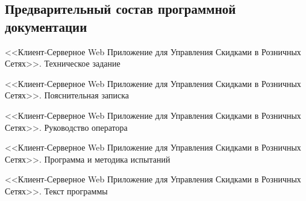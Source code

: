 \subsection{Предварительный состав программной документации}
\begin{my_enumerate}
    \item <<Клиент-Серверное Web Приложение для Управления Скидками в Розничных
      Сетях>>. Техническое задание
    \item <<Клиент-Серверное Web Приложение для Управления Скидками в Розничных
      Сетях>>. Пояснительная записка
    \item <<Клиент-Серверное Web Приложение для Управления Скидками в Розничных
      Сетях>>. Руководство оператора
    \item <<Клиент-Серверное Web Приложение для Управления Скидками в Розничных
      Сетях>>. Программа и методика испытаний
    \item <<Клиент-Серверное Web Приложение для Управления Скидками в Розничных
      Сетях>>. Текст программы
\end{my_enumerate}

